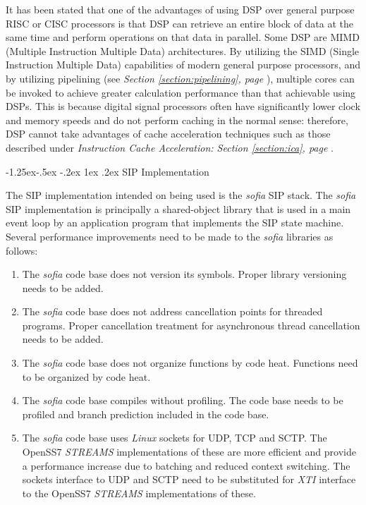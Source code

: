 \documentclass[letterpaper,final,notitlepage,twocolumn,10pt,twoside]{article}
\makeatletter
\let\normalsize = \small
\let\small = \footnotesize
\let\footnotesize = \scriptsize
\let\scriptsize = \tiny
\renewcommand\subsubsection{\@startsection{subsubsection}{3}{\z@}%
                                     {-1.25ex\@plus -.5ex \@minus -.2ex}%
                                     {1ex \@plus .2ex}%
                                     {\normalfont\normalsize\bfseries}}
\makeatother
\begin{document}
It has been stated that one of the advantages of using DSP over general
purpose RISC or CISC processors is that DSP can retrieve an entire block of
data at the same time and perform operations on that data in parallel.  Some
DSP are MIMD (Multiple Instruction Multiple Data) architectures.  By utilizing
the SIMD (Single Instruction Multiple Data) capabilities of modern general
purpose processors, and by utilizing pipelining (see {\sl Section
\ref{section:pipelining}, page \pageref{section:pipelining}}), multiple cores
can be invoked to achieve greater calculation performance than that achievable
using DSPs.  This is because digital signal processors often have
significantly lower clock and memory speeds and do not perform caching in the
normal sense: therefore, DSP cannot take advantages of cache acceleration
techniques such as those described under {\sl Instruction Cache Acceleration:
Section \ref{section:ica}, page \pageref{section:ica}}.

\subsubsection{SIP Implementation}
\label{section:sip}

The SIP implementation intended on being used is the {\sl sofia} SIP stack.
The {\sl sofia} SIP implementation is principally a shared-object library that
is used in a main event loop by an application program that implements the SIP
state machine.  Several performance improvements need to be made to the {\sl
sofia} libraries as follows:

\begin{enumerate}

\item The {\sl sofia} code base does not version its symbols.  Proper library
versioning needs to be added.

\item The {\sl sofia} code base does not address cancellation points for
threaded programs.  Proper cancellation treatment for asynchronous thread
cancellation needs to be added.

\item The {\sl sofia} code base does not organize functions by code heat.
Functions need to be organized by code heat.

\item The {\sl sofia} code base compiles without profiling.  The code base
needs to be profiled and branch prediction included in the code base.

\item The {\sl sofia} code base uses {\sl Linux} sockets for UDP, TCP and
SCTP.  The OpenSS7 {\sl STREAMS} implementations of these are more efficient
and provide a performance increase due to batching and reduced context
switching.  The sockets interface to UDP and SCTP need to be substituted for
{\sl XTI} interface to the OpenSS7 {\sl STREAMS} implementations of these.

\end{enumerate}
\end{document}
